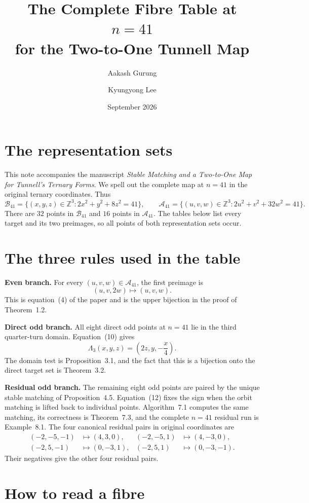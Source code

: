 \documentclass[11pt]{amsart}
\title[The complete fibre table at $n=41$]
{The Complete Fibre Table at $n=41$\\
for the Two-to-One Tunnell Map}
\author{Aakash Gurung}
\author{Kyungyong Lee}
\date{September 2026}
\newcommand{\Z}{\mathbb Z}
\newcommand{\B}{\mathcal B_{41}}
\newcommand{\A}{\mathcal A_{41}}
\begin{document}
\maketitle

\section*{The representation sets}

This note accompanies the manuscript \emph{Stable Matching and a Two-to-One
Map for Tunnell's Ternary Forms}.  We spell out the complete map at $n=41$ in
the original ternary coordinates.  Thus
\[
 \B=\{(x,y,z)\in\Z^3:2x^2+y^2+8z^2=41\},
 \qquad
 \A=\{(u,v,w)\in\Z^3:2u^2+v^2+32w^2=41\}.
\]
There are $32$ points in $\B$ and $16$ points in $\A$.  The tables below list
every target and its two preimages, so all points of both representation sets
occur.

\section*{The three rules used in the table}

\textbf{Even branch.}
For every $(u,v,w)\in\A$, the first preimage is
\[
 (u,v,2w)\longmapsto(u,v,w).
\]
This is equation~(4) of the paper and is the upper bijection in the proof of
Theorem~1.2.

\textbf{Direct odd branch.}
All eight direct odd points at $n=41$ lie in the third quarter-turn domain.
Equation~(10) gives
\[
 \Lambda_3(x,y,z)=\left(2z,y,-\frac{x}{4}\right).
\]
The domain test is Proposition~3.1, and the fact that this is a bijection onto
the direct target set is Theorem~3.2.

\textbf{Residual odd branch.}
The remaining eight odd points are paired by the unique stable matching of
Proposition~4.5.  Equation~(12) fixes the sign when the orbit matching is
lifted back to individual points.  Algorithm~7.1 computes the same matching,
its correctness is Theorem~7.3, and the complete $n=41$ residual run is
Example~8.1.  The four canonical residual pairs in original coordinates are
\[
\begin{aligned}
 (-2,-5,-1)&\longmapsto(4,3,0),&
 (-2,-5,1)&\longmapsto(4,-3,0),\\
 (-2,5,-1)&\longmapsto(0,-3,1),&
 (-2,5,1)&\longmapsto(0,-3,-1).
\end{aligned}
\]
Their negatives give the other four residual pairs.

\section*{How to read a fibre}
\end{document}
